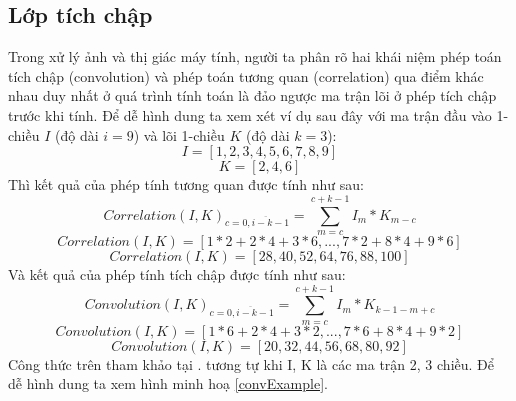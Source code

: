 \subsection{Lớp tích chập}
Trong xử lý ảnh và thị giác máy tính, người ta phân rõ hai khái niệm phép toán tích chập (convolution) và phép toán tương quan (correlation) qua điểm khác nhau duy nhất ở quá trình tính toán là đảo ngược ma trận lõi ở phép tích chập trước khi tính. Để dễ hình dung ta xem xét ví dụ sau đây với ma trận đầu vào 1-chiều $I$ (độ dài $i=9$) và lõi 1-chiều $K$ (độ dài $k=3$):
$$ I = [1, 2, 3, 4, 5, 6, 7, 8, 9]$$
$$ K = [2, 4, 6] $$
Thì kết quả của phép tính tương quan được tính như sau:
$$ Correlation(I,K)_{c = \overline{0, i - k - 1}} = \sum_{m=c}^{c + k-1}I_{m}*K_{m-c}$$
$$ Correlation(I,K) = [1*2 + 2*4 + 3*6, ... , 7*2 + 8*4 + 9*6] $$
$$ Correlation(I,K) = [28,  40,  52,  64,  76,  88, 100] $$
Và kết quả của phép tính tích chập được tính như sau:
$$ Convolution(I,K)_{c = \overline{0, i - k - 1}} = \sum_{m=c}^{c + k-1}I_{m}*K_{k - 1 - m + c}$$
$$ Convolution(I,K) = [1*6 + 2*4 + 3*2, ... , 7*6 + 8*4 + 9*2] $$
$$ Convolution(I,K) = [20, 32, 44, 56, 68, 80, 92] $$
Công thức trên tham khảo tại \cite{convSlide}. tương tự khi I, K là các ma trận 2, 3 chiều. Để dễ hình dung ta xem hình minh hoạ \ref{convExample}.

